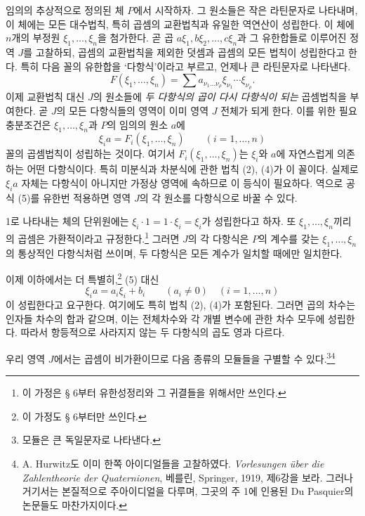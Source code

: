 임의의 추상적으로 정의된 체 \(P\)에서 시작하자. 그 원소들은 작은 라틴문자로 나타내며, 이 체에는 모든 대수법칙, 특히 곱셈의 교환법칙과 유일한 역연산이 성립한다. 이 체에 \(n\)개의 부정원 \(\xi_1,\ldots,\xi_n\)을 첨가한다. 곧 곱 \(a\xi_1,b\xi_2,\ldots,c\xi_n\)과 그 유한합들로 이루어진 정역 \(J\)를 고찰하되, 곱셈의 교환법칙을 제외한 덧셈과 곱셈의 모든 법칙이 성립한다고 한다. 특히 다음 꼴의 유한합을 ‘다항식’이라고 부르고, 언제나 큰 라틴문자로 나타낸다.
\[
 F(\xi_1,\ldots,\xi_n)=\sum a_{\nu_1\ldots\nu_\rho}\xi_{\nu_1}\cdots\xi_{\nu_\rho}.
\]
이제 교환법칙 대신 \(J\)의 원소들에 \emph{두 다항식의 곱이 다시 다항식이 되는} 곱셈법칙을 부여한다. 곧 \(J\)의 모든 다항식들의 영역이 이미 영역 \(J\) 전체가 되게 한다. 이를 위한 필요충분조건은 \(\xi_1,\ldots,\xi_n\)과 \(P\)의 임의의 원소 \(a\)에
\begin{equation}
 \xi_i a=F_i(\xi_1,\ldots,\xi_n)\qquad (i=1,\ldots,n)
\tag{5}
\end{equation}
꼴의 곱셈법칙이 성립하는 것이다. 여기서 \(F_i(\xi_1,\ldots,\xi_n)\)는 \(\xi_i\)와 \(a\)에 자연스럽게 의존하는 어떤 다항식이다. 특히 미분식과 차분식에 관한 법칙 (2), (4)가 이 꼴이다. 실제로 \(\xi_i a\) 자체는 다항식이 아니지만 가정상 영역에 속하므로 이 등식이 필요하다. 역으로 공식 (5)를 유한번 적용하면 영역 \(J\)의 각 원소를 다항식으로 바꿀 수 있다.

1로 나타내는 체의 단위원에는 \(\xi_i\cdot1=1\cdot\xi_i=\xi_i\)가 성립한다고 하자. 또 \(\xi_1,\ldots,\xi_n\)끼리의 곱셈은 가환적이라고 규정한다.\footnote{이 가정은 § 6부터 유한성정리와 그 귀결들을 위해서만 쓰인다.} 그러면 \(J\)의 각 다항식은 \(P\)의 계수를 갖는 \(\xi_1,\ldots,\xi_n\)의 통상적인 다항식처럼 쓰이며, 두 다항식은 모든 계수가 일치할 때에만 일치한다.

이제 이하에서는 더 특별히,\footnote{이 가정도 § 6부터만 쓰인다.} (5) 대신
\begin{equation}
 \xi_i a=a_i\xi_i+b_i\qquad (a_i\ne0)\quad(i=1,\ldots,n)
\tag{6}
\end{equation}
이 성립한다고 요구한다. 여기에도 특히 법칙 (2), (4)가 포함된다. 그러면 곱의 차수는 인자들 차수의 합과 같으며, 이는 전체차수와 각 개별 변수에 관한 차수 모두에 성립한다. 따라서 항등적으로 사라지지 않는 두 다항식의 곱도 영과 다르다.


우리 영역 \(J\)에서는 곱셈이 비가환이므로 다음 종류의 모듈들을 구별할 수 있다.\footnote{모듈은 큰 독일문자로 나타낸다.}\footnote{A. Hurwitz도 이미 한쪽 아이디얼들을 고찰하였다. \emph{Vorlesungen über die Zahlentheorie der Quaternionen}, 베를린, Springer, 1919, 제6강을 보라. 그러나 거기서는 본질적으로 주아이디얼을 다루며, 그곳의 주 1에 인용된 Du Pasquier의 논문들도 마찬가지이다.}

